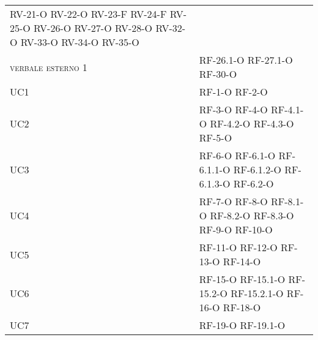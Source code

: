 \begin{longtable}{ 
		>{}p{} 
		>{}p{} }
	RV-21-O	\newline
	RV-22-O	\newline
	RV-23-F	\newline
	RV-24-F	\newline
	RV-25-O	\newline
	RV-26-O	\newline
	RV-27-O	\newline
	RV-28-O	\newline
	RV-32-O	\newline
	RV-33-O	\newline
	RV-34-O	\newline
	RV-35-O	\tabularnewline
\textsc{verbale esterno 1} &	RF-26.1-O	\newline
	RF-27.1-O	\newline
	RF-30-O	\tabularnewline
UC1 &	RF-1-O	\newline
	RF-2-O	\tabularnewline
UC2 &	RF-3-O	\newline
	RF-4-O	\newline
	RF-4.1-O	\newline
	RF-4.2-O	\newline
	RF-4.3-O	\newline
	RF-5-O	\tabularnewline
UC3 &	RF-6-O	\newline
	RF-6.1-O	\newline
	RF-6.1.1-O	\newline
	RF-6.1.2-O	\newline
	RF-6.1.3-O	\newline
	RF-6.2-O	\tabularnewline
UC4 &	RF-7-O	\newline
	RF-8-O	\newline
	RF-8.1-O	\newline
	RF-8.2-O	\newline
	RF-8.3-O	\newline
	RF-9-O	\newline
	RF-10-O	\tabularnewline
UC5 &	RF-11-O	\newline
	RF-12-O	\newline
	RF-13-O	\newline
	RF-14-O	\tabularnewline
UC6 &	RF-15-O	\newline
	RF-15.1-O	\newline
	RF-15.2-O	\newline
	RF-15.2.1-O	\newline
	RF-16-O	\newline
	RF-18-O	\tabularnewline
UC7 &	RF-19-O	\newline
	RF-19.1-O	\newline

\end{longtable}
